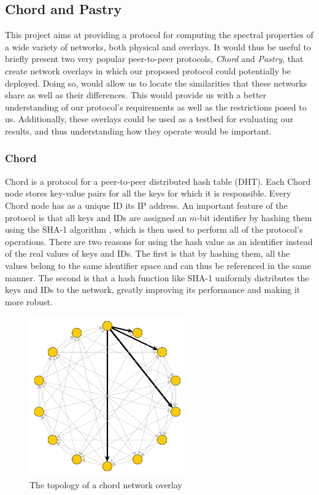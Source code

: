 \documentclass[a4paper,11pt,twoside]{report}
\begin{document}
\subsection{Chord and Pastry}
\label{sec:pastry_chord}

This project aims at providing a protocol for computing the spectral properties of a wide variety of networks, both physical and overlays. It would thus be useful to briefly present two very popular peer-to-peer protocols, \textit{Chord} and \textit{Pastry}, that create network overlays in which our proposed protocol could potentially be deployed. Doing so, would allow us to locate the similarities that these networks share as well as their differences. This would provide us with a better understanding of our protocol's requirements as well as the restrictions posed to us. Additionally, these overlays could be used as a testbed for evaluating our results, and thus understanding how they operate would be important.



\subsubsection*{Chord}

Chord \cite{Stoica:2001:CSP:964723.383071} is a protocol for a peer-to-peer distributed hash table (DHT). Each Chord node stores key-value pairs for all the keys for which it is responsible. Every Chord node has as a unique ID its IP address. An important feature of the protocol is that all keys and IDs are assigned an $m$-bit identifier by hashing them using the SHA-1 algorithm \cite{Eastlake:2001:USH:RFC3174}, which is then used to perform all of the protocol's operations. There are two reasons for using the hash value as an identifier instead of the real values of keys and IDs. The first is that by hashing them, all the values belong to the same identifier space and can thus be referenced in the same manner. The second is that a hash function like SHA-1 uniformly distributes the keys and IDs to the network, greatly improving its performance and making it more robust.

\begin{figure}[h]
\centering
\includegraphics[width=0.6\textwidth]{../figures/chord.png}
\caption{The topology of a chord network overlay}
\label{fig:chord_overlay}
\end{figure}
\end{document}
